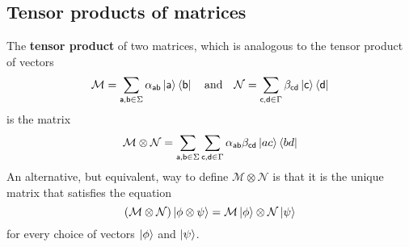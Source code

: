 \subsection{Tensor products of matrices}
The \textbf{tensor product} of two matrices, which is analogous to the tensor product of vectors
\begin{equation*}
    \mathcal{M}=\sum\limits_{\textsf{a,b}\in\Sigma}\alpha_{\textsf{ab}}\ket{\textsf{a}}\bra{\textsf{b}} \quad \text{and} \quad \mathcal{N}=\sum\limits_{\textsf{c,d}\in\Gamma}\beta_{\textsf{cd}}\ket{\textsf{c}}\bra{\textsf{d}}
\end{equation*}
is the matrix
\begin{equation*}
    \mathcal{M}\otimes\mathcal{N}=\sum\limits_{\textsf{a,b}\in\Sigma}\sum\limits_{\textsf{c,d}\in\Gamma}\alpha_{\textsf{ab}}\beta_{\textsf{cd}}\ket{ac}\bra{bd}
\end{equation*}
An alternative, but equivalent, way to define $\mathcal{M}\otimes\mathcal{N}$ is that it is the unique matrix that satisfies the equation
\begin{equation*}
    (\mathcal{M}\otimes\mathcal{N})\ket{\phi\otimes\psi}=\mathcal{M}\ket{\phi}\otimes\mathcal{N}\ket{\psi}
\end{equation*}
for every choice of vectors $\ket{\phi}$ and $\ket{\psi}$.

